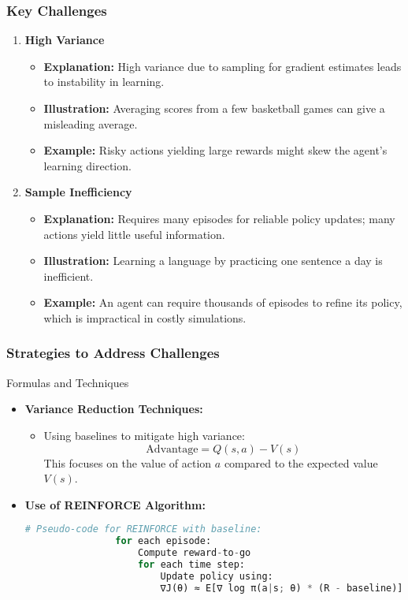 \documentclass[aspectratio=169]{beamer}
\begin{document}
\begin{frame}[fragile]
    \frametitle{Key Challenges}
    \begin{enumerate}
        \item \textbf{High Variance}
            \begin{itemize}
                \item \textbf{Explanation:} High variance due to sampling for gradient estimates leads to instability in learning.
                \item \textbf{Illustration:} Averaging scores from a few basketball games can give a misleading average.
                \item \textbf{Example:} Risky actions yielding large rewards might skew the agent’s learning direction.
            \end{itemize}
        \item \textbf{Sample Inefficiency}
            \begin{itemize}
                \item \textbf{Explanation:} Requires many episodes for reliable policy updates; many actions yield little useful information.
                \item \textbf{Illustration:} Learning a language by practicing one sentence a day is inefficient.
                \item \textbf{Example:} An agent can require thousands of episodes to refine its policy, which is impractical in costly simulations.
            \end{itemize}
    \end{enumerate}
\end{frame}

\begin{frame}[fragile]
    \frametitle{Strategies to Address Challenges}
    \begin{block}{Formulas and Techniques}
        \begin{itemize}
            \item \textbf{Variance Reduction Techniques:}
                \begin{itemize}
                    \item Using baselines to mitigate high variance:
                        \[
                        \text{Advantage} = Q(s, a) - V(s)
                        \]
                    This focuses on the value of action \( a \) compared to the expected value \( V(s) \).
                \end{itemize}
            \item \textbf{Use of REINFORCE Algorithm:}
                \begin{lstlisting}[language=Python]
                # Pseudo-code for REINFORCE with baseline:
                for each episode:
                    Compute reward-to-go
                    for each time step:
                        Update policy using:
                        ∇J(θ) ≈ E[∇ log π(a|s; θ) * (R - baseline)]
                \end{lstlisting}
        \end{itemize}
    \end{block}
\end{frame}
\end{document}
